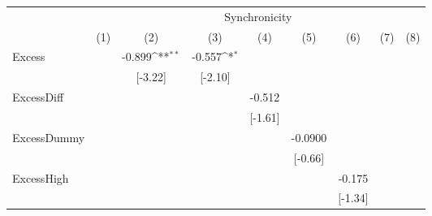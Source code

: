 {
\def\sym#1{\ifmmode^{#1}\else\(^{#1}\)\fi}
\begin{tabular}{l*{8}{c}}
\hline\hline
                    &\multicolumn{8}{c}{Synchronicity}                                                                                                                                              \\\cmidrule(lr){2-9}
                    &\multicolumn{1}{c}{(1)}         &\multicolumn{1}{c}{(2)}         &\multicolumn{1}{c}{(3)}         &\multicolumn{1}{c}{(4)}         &\multicolumn{1}{c}{(5)}         &\multicolumn{1}{c}{(6)}         &\multicolumn{1}{c}{(7)}         &\multicolumn{1}{c}{(8)}         \\
\hline
Excess              &                     &      -0.899\sym{**} &      -0.557\sym{*}  &                     &                     &                     &                     &                     \\
                    &                     &     [-3.22]         &     [-2.10]         &                     &                     &                     &                     &                     \\
[1em]
ExcessDiff          &                     &                     &                     &      -0.512         &                     &                     &                     &                     \\
                    &                     &                     &                     &     [-1.61]         &                     &                     &                     &                     \\
[1em]
ExcessDummy         &                     &                     &                     &                     &     -0.0900         &                     &                     &                     \\
                    &                     &                     &                     &                     &     [-0.66]         &                     &                     &                     \\
[1em]
ExcessHigh          &                     &                     &                     &                     &                     &      -0.175         &                     &                     \\
                    &                     &                     &                     &                     &                     &     [-1.34]         &                     &                     \\

\end{tabular}}
